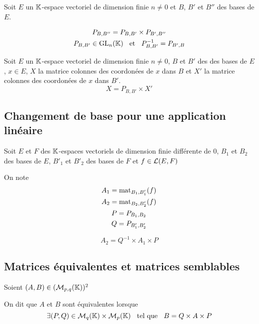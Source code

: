 \begin{prp}
Soit $E$ un $\mathbb{K}$-espace vectoriel de dimension finie $n \neq 0$ et $B$, $B'$
et $B''$ des bases de $E$.

\begin{gather*}
    P_{B, B''} = P_{B, B'} \times P_{B', B''} \\
    P_{B, B'} \in \mathrm{GL}_n(\mathbb{K}) \;\;\text{ et }\;\; P^{-1}_{B, B'} = P_{B', B}
\end{gather*}
\end{prp}

\begin{prp}
Soit $E$ un $\mathbb{K}$-espace vectoriel de dimension finie $n \neq 0$,
$B$ et $B'$ des  des bases de $E$, $x \in E$, $X$ la matrice
colonnes des coordonées de $x$ dans $B$ et $X'$ la matrice
colonnes des coordonées de $x$ dans $B'$.
\[
    X = P_{B, B'} \times X'
\]
\end{prp}


\subsection{Changement de base pour une application linéaire}

\begin{prp}
Soit $E$ et $F$ des $\mathbb{K}$-espaces vectoriels de dimension finie
différente de $0$, $B_1$ et $B_2$ des bases de $E$, $B'_1$ et $B'_2$
des bases de $F$ et $f \in \operatorname{\mathcal{L}}(E, F)$

On note
\begin{gather*}
    A_1 = \operatorname{mat}_{B_1, B'_1}(f) \\
    A_2 = \operatorname{mat}_{B_2, B'_2}(f) \\
    P = P_{B_1, B_2} \\
    Q = P_{B'_1, B'_2}
\end{gather*}

\[
    A_2 = Q^{-1} \times A_1 \times P
\]
\end{prp}

\subsection{Matrices équivalentes et matrices semblables}

\begin{dfn}
Soient $(A, B) \in (\operatorname{\mathcal{M}}_{p, q}(\mathbb{K}))^2$

On dit que $A$ et $B$ sont équivalentes lorsque
\[
    \exists (P, Q) \in \operatorname{\mathcal{M}}_q(\mathbb{K}) \times \operatorname{\mathcal{M}}_p(\mathbb{K}) \;\;\text{ tel que }\;\; B = Q \times A \times P
\]
\end{dfn}


